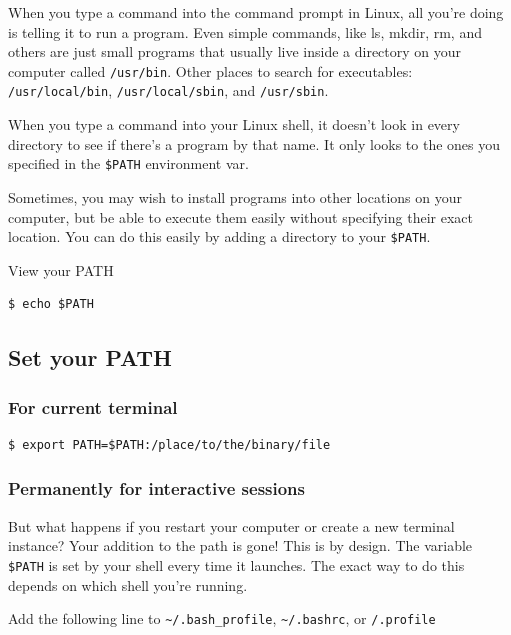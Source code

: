 \documentclass{article}
\newenvironment{codetemplate}[1][]{%
  \mybasecolorbox[#1]
  \itshape
}{%
  \endmybasecolorbox
}
\begin{document}
When you type a command into the command prompt in Linux, all you're doing is telling it to run a program. Even simple commands, like ls, mkdir, rm, and others are just small programs that usually live inside a directory on your computer called \verb|/usr/bin|. Other places to search for executables: \verb+/usr/local/bin+, \verb+/usr/local/sbin+, and \verb+/usr/sbin+. 

When you type a command into your Linux shell, it doesn't look in every directory to see if there's a program by that name. It only looks to the ones you specified in the \verb|$PATH| environment var.

Sometimes, you may wish to install programs into other locations on your computer, but be able to execute them easily without specifying their exact location. You can do this easily by adding a directory to your \verb|$PATH|.

View your PATH
\begin{codetemplate}{}
\begin{verbatim}
$ echo $PATH
\end{verbatim}
\end{codetemplate}

\subsection{Set your PATH}
\subsubsection{For current terminal}
\begin{codetemplate}{}
\begin{verbatim}
$ export PATH=$PATH:/place/to/the/binary/file
\end{verbatim}
\end{codetemplate}

\subsubsection{Permanently for interactive sessions}

But what happens if you restart your computer or create a new terminal instance? Your addition to the path is gone! This is by design. The variable \verb|$PATH| is set by your shell every time it launches. The exact way to do this depends on which shell you're running.

Add the following line to \verb|~/.bash_profile|, \verb|~/.bashrc|, or \verb|/.profile|
\end{document}
